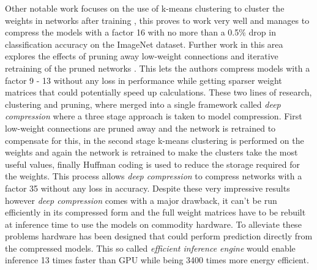 \documentclass[11pt]{article}
\newcommand{\bibentry}[1]{\cite{#1}}
\begin{document}
Other notable work focuses on the use of k-means clustering to cluster the weights in networks after training \bibentry{gong2014compressing}, this proves to work very well and manages to compress the models with a factor 16 with no more than a 0.5\% drop in classification accuracy on the ImageNet dataset. Further work in this area explores the effects of pruning away low-weight connections and iterative retraining of the pruned networks \bibentry{han2015learning}. This lets the authors compress models with a factor 9 - 13 without any loss in performance while getting sparser weight matrices that could potentially speed up calculations. These two lines of research, clustering and pruning, where merged into a single framework called \emph{deep compression} \bibentry{han2015deep} where a three stage approach is taken to model compression. First low-weight connections are pruned away and the network is retrained to compensate for this, in the second stage k-means clustering is performed on the weights and again the network is retrained to make the clusters take the most useful values, finally Huffman coding \bibentry{van1976construction} is used to reduce the storage required for the weights. This process allows \emph{deep compression} to compress networks with a factor 35 without any loss in accuracy. Despite these very impressive results however \emph{deep compression} comes with a major drawback, it can't be run efficiently in its compressed form and the full weight matrices have to be rebuilt at inference time to use the models on commodity hardware. To alleviate these problems hardware has been designed that could perform prediction directly from the compressed models. This so called \emph{efficient inference engine} \bibentry{han2016eie} would enable inference 13 times faster than GPU while being 3400 times more energy efficient.
\end{document}
